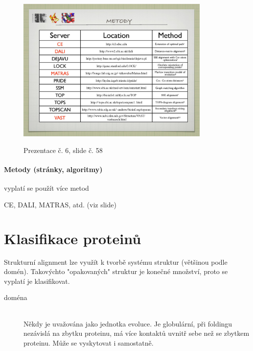 \documentclass[DIV=8]{scrreprt}
\begin{document}
\begin{figure}
    \caption{Prezentace č. 6, slide č. 58}
    \includegraphics[width=0.85\textwidth]{slides-6/slide-58.jpg}
    \centering
    \label{slides-6-slide-58}
\end{figure}

\paragraph{Metody (stránky, algoritmy)}
\begin{myItemize}[nosep]
    \item vyplatí se použít více metod
    \item CE, DALI, MATRAS, atd. (viz slide)
\end{myItemize}



\section{Klasifikace proteinů} \label{Klasifikace proteinů} \FloatBarrier


Strukturní alignment lze využít k tvorbě systému struktur (většinou podle domén). Takovýchto "opakovaných" struktur je konečné množství, proto se vyplatí je klasifikovat.

\begin{description}
\item[doména]\hfill \\
Někdy je uvažována jako jednotka evoluce. Je globulární, při foldingu nezávislá na zbytku proteinu, má více kontaktů uvnitř sebe než se zbytkem proteinu. Může se vyskytovat i samostatně.

\end{description}
\end{document}
